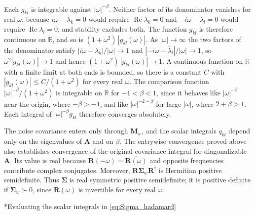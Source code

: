 \documentclass[12pt]{article}
\makeatletter
\renewcommand\subsection{\@startsection{subsection}{2}{\z@}{-1.5ex plus -.5ex minus -.2ex}{1.5ex plus .2ex}{\normalfont\large\bfseries}}
\newcommand{\R}{\mathbb{R}}
\makeatother
\begin{document}
Each $g_{kl}$ is integrable against $|\omega|^{-\beta}$. Neither factor of its denominator vanishes for real $\omega$, because
$i\omega-\lambda_k=0$ would require $\operatorname{Re}\lambda_k=0$ and $-i\omega-\bar\lambda_l=0$ would require
$\operatorname{Re}\lambda_l=0$, and stability excludes both. The function $g_{kl}$ is therefore continuous on $\R$, and so is
$(1+\omega^2)\,|g_{kl}(\omega)|$. As $|\omega|\to\infty$ the two factors of the denominator satisfy
$|i\omega-\lambda_k|/|\omega|\to1$ and $|{-i\omega}-\bar\lambda_l|/|\omega|\to1$, so $\omega^2|g_{kl}(\omega)|\to1$ and hence
$(1+\omega^2)\,|g_{kl}(\omega)|\to1$. A continuous function on $\R$ with a finite limit at both ends is bounded, so there is a
constant $C$ with $|g_{kl}(\omega)|\le C/(1+\omega^2)$ for every real $\omega$. The comparison function
$|\omega|^{-\beta}/(1+\omega^2)$ is integrable on $\R$ for $-1<\beta<1$, since it behaves like $|\omega|^{-\beta}$ near the origin,
where $-\beta>-1$, and like $|\omega|^{-2-\beta}$ for large $|\omega|$, where $2+\beta>1$. Each integral of $|\omega|^{-\beta}g_{kl}$
therefore converges absolutely.

The noise covariance enters only through $\mathbf{M}_w$, and the scalar integrals $q_{kl}$ depend only on the eigenvalues of
$\mathbf{A}$ and on $\beta$.
The entrywise convergence proved above also establishes convergence of the original covariance integral for diagonalizable
$\mathbf A$. Its value is real because $\mathbf R(-\omega)=\overline{\mathbf R(\omega)}$ and opposite frequencies contribute
complex conjugates. Moreover, $\mathbf R\boldsymbol{\Sigma}_w\mathbf R^\dagger$ is Hermitian positive semidefinite.
Thus $\boldsymbol{\Sigma}$ is real symmetric positive semidefinite; it is positive definite if
$\boldsymbol{\Sigma}_w\succ0$, since $\mathbf R(\omega)$ is invertible for every real $\omega$.

\subsection*{Evaluating the scalar integrals in \ref{eq:Sigma_hadamard}}

\end{document}
